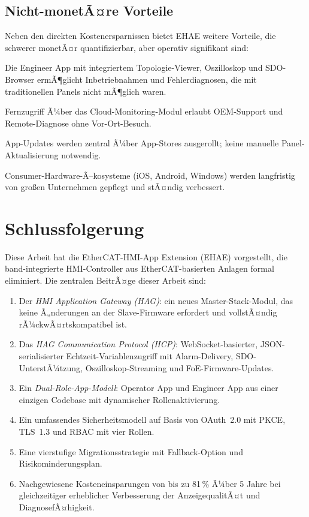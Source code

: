 ﻿\documentclass[12pt,a4paper]{article}
\begin{document}
\subsection{Nicht-monetÃ¤re Vorteile}

Neben den direkten Kostenersparnissen bietet EHAE weitere Vorteile, die schwerer
monetÃ¤r quantifizierbar, aber operativ signifikant sind:

\begin{description}[leftmargin=2em]
  \item[Verbesserte DiagnosefÃ¤higkeit] Die Engineer App mit integriertem Topologie-Viewer,
    Oszilloskop und SDO-Browser ermÃ¶glicht Inbetriebnahmen und Fehlerdiagnosen, die mit
    traditionellen Panels nicht mÃ¶glich waren.
  \item[OrtsunabhÃ¤ngiges Monitoring] Fernzugriff Ã¼ber das Cloud-Monitoring-Modul erlaubt
    OEM-Support und Remote-Diagnose ohne Vor-Ort-Besuch.
  \item[KÃ¼rzere Update-Zyklen] App-Updates werden zentral Ã¼ber App-Stores ausgerollt;
    keine manuelle Panel-Aktualisierung notwendig.
  \item[Zukunftssicherheit] Consumer-Hardware-Ã–kosysteme (iOS, Android, Windows)
    werden langfristig von gro\ss{}en Unternehmen gepflegt und stÃ¤ndig verbessert.
\end{description}

\section{Schlussfolgerung}
\label{sec:conclusion}

Diese Arbeit hat die EtherCAT-HMI-App Extension (EHAE) vorgestellt, die
band-integrierte HMI-Controller aus EtherCAT-basierten Anlagen formal eliminiert. Die
zentralen BeitrÃ¤ge dieser Arbeit sind:

\begin{enumerate}[leftmargin=2em]
  \item Der \emph{HMI Application Gateway (HAG)}: ein neues Master-Stack-Modul, das
    keine Ã„nderungen an der Slave-Firmware erfordert und vollstÃ¤ndig rÃ¼ckwÃ¤rtskompatibel
    ist.
  \item Das \emph{HAG Communication Protocol (HCP)}: WebSocket-basierter,
    JSON-serialisierter Echtzeit-Variablenzugriff mit Alarm-Delivery, SDO-UnterstÃ¼tzung,
    Oszilloskop-Strea\-ming und FoE-Firmware-Updates.
  \item Ein \emph{Dual-Role-App-Modell}: Operator App und Engineer App aus einer einzigen
    Codebase mit dynamischer Rollenaktivierung.
  \item Ein umfassendes Sicherheitsmodell auf Basis von OAuth~2.0 mit PKCE, TLS~1.3 und
    RBAC mit vier Rollen.
  \item Eine vierstufige Migrationsstrategie mit Fallback-Option und Risikominderungsplan.
  \item Nachgewiesene Kosteneinsparungen von bis zu 81\,\% Ã¼ber 5 Jahre bei gleichzeitiger
    erheblicher Verbesserung der AnzeigequalitÃ¤t und DiagnosefÃ¤higkeit.
\end{enumerate}
\end{document}
